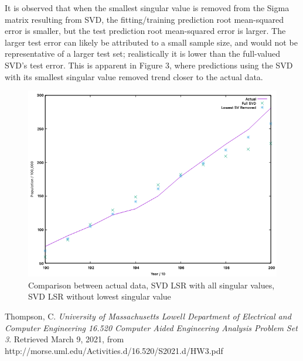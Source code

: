 \documentclass{report}
\begin{document}
\noindent It is observed that when the smallest singular value is removed from the Sigma matrix resulting from SVD, the fitting/training prediction root mean-squared error is smaller, but the test prediction root mean-squared error is larger. The larger test error can likely be attributed to a small sample size, and would not be representative of a larger test set; realistically it is lower than the full-valued SVD's test error. This is apparent in Figure 3, where predictions using the SVD with its smallest singular value removed trend closer to the actual data.

\begin{figure}[!ht]
	\centering
	\includegraphics[scale=0.7]{figures/q4_results.png}
	\caption{Comparison between actual data, SVD LSR with all singular values, SVD LSR without lowest singular value}
\end{figure}

	\begin{thebibliography}{99\kern\bibindent}
	
	Thompson, C.
	\textit{University of Massachusetts Lowell Department of Electrical and Computer Engineering 16.520 Computer Aided Engineering Analysis Problem Set 3}.
	Retrieved March 9, 2021, from http://morse.uml.edu/Activities.d/16.520/S2021.d/HW3.pdf
	
	\end{thebibliography}
\end{document}
